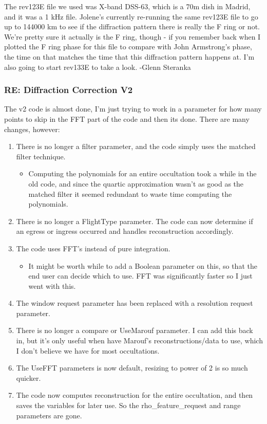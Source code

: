 \documentclass[crop=false,class=article,oneside]{standalone}
\begin{document}
The rev123E file we used was X-band DSS-63, which is a 70m dish in Madrid, and it was a 1 kHz file. Jolene’s currently re-running the same rev123E file to go up to 144000 km to see if the diffraction pattern there is really the F ring or not. We’re pretty sure it actually is the F ring, though - if you remember back when I plotted the F ring phase for this file to compare with John Armstrong’s phase, the time on that matches the time that this diffraction pattern happens at. I’m also going to start rev133E to take a look. -Glenn Steranka
\subsubsection{RE: Diffraction Correction V2}
The v2 code is almost done, I'm just trying to work in a parameter for how many points to skip in the FFT part of the code and then its done. There are many changes, however:
\begin{enumerate}
    \item There is no longer a filter parameter, and the code simply uses the matched filter technique.
    \begin{itemize}
        \item Computing the polynomials for an entire occultation took a while in the old code, and since the quartic approximation wasn't as good as the matched filter it seemed redundant to waste time computing the polynomials.
    \end{itemize}
    \item There is no longer a FlightType parameter. The code can now determine if an egress or ingress occurred and handles reconstruction accordingly.
    \item The code uses FFT's instead of pure integration.
    \begin{itemize}
        \item It might be worth while to add a Boolean parameter on this, so that the end user can decide which to use. FFT was significantly faster so I just went with this.
    \end{itemize}
    \item The window request parameter has been replaced with a resolution request parameter.
    \item There is no longer a compare or UseMarouf parameter. I can add this back in, but it's only useful when have Marouf's reconstructions/data to use, which I don't believe we have for most occultations.
    \item The UseFFT parameters is now default, resizing to power of 2 is so much quicker.
    \item The code now computes reconstruction for the entire occultation, and then saves the variables for later use. So the rho\_feature\_request and range parameters are gone.
\end{enumerate}
\end{document}
